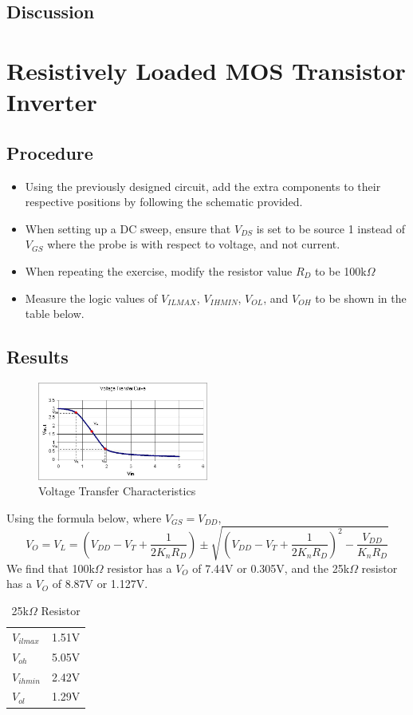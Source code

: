 \documentclass[12pt]{article}
\begin{document}
\subsection{Discussion}

\section{Resistively Loaded MOS Transistor Inverter}
\subsection{Procedure}
\begin{itemize}
\item Using the previously designed circuit, add the extra components to their respective positions by following the schematic provided.
\item When setting up a DC sweep, ensure that $V_{DS}$ is set to be source 1 instead of $V_{GS}$ where the probe is with respect to voltage, and not current.
\item When repeating the exercise, modify the resistor value $R_D$ to be 100k$\Omega$
\item Measure the logic values of $V_{IL MAX}$, $V_{IH MIN}$, $V_{OL}$, and $V_{OH}$ to be shown in the table below.
\end{itemize}
\subsection{Results}
\begin{figure}[h]
\centering
\includegraphics[width=0.5\textwidth]{4.jpg}
\caption{Voltage Transfer Characteristics}
\end{figure}
Using the formula below, where $V_{GS}=V_{DD}$,
$$V_O=V_L=\left(V_{DD}-V_T+\frac{1}{2K_nR_D}\right)\pm\sqrt{\left(V_{DD}-V_T+\frac{1}{2K_nR_D}\right)^{2}-\frac{V_{DD}}{K_nR_D}}$$
We find that 100k$\Omega$ resistor has a $V_O$ of 7.44V or 0.305V, and the 25k$\Omega$ resistor has a $V_O$ of 8.87V or 1.127V.
\begin{table}[h]
\centering
\begin{tabular}{ll}
$V_{il max}$ & 1.51V \\
$V_{oh}$ & 5.05V \\
$V_{ih min}$ & 2.42V \\
$V_{ol}$ & 1.29V
\end{tabular}
\caption{25k$\Omega$ Resistor}
\end{table}
\end{document}
